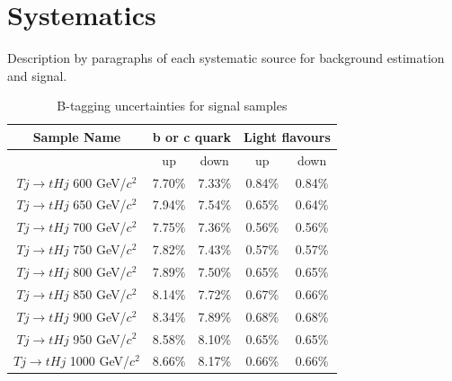 \section{Systematics}
\label{sec:sys}

Description by paragraphs of each systematic source for background estimation and signal.

\begin{table}[htbH]
\begin{center}
\begin{tabular}{|c|c|c|c|c|}
\hline 
Sample Name & \multicolumn{2}{c|}{b or c quark} & \multicolumn{2}{c|}{Light flavours} \\
\hline
 & up & down & up & down \\
\hline
$Tj\rightarrow tHj$ 600 GeV/$c^{2}$ & 7.70\% & 7.33\% & 0.84\% & 0.84\% \\
$Tj\rightarrow tHj$ 650 GeV/$c^{2}$ & 7.94\% & 7.54\% & 0.65\% & 0.64\% \\
$Tj\rightarrow tHj$ 700 GeV/$c^{2}$ & 7.75\% & 7.36\% & 0.56\% & 0.56\% \\
$Tj\rightarrow tHj$ 750 GeV/$c^{2}$ & 7.82\% & 7.43\% & 0.57\% & 0.57\% \\
$Tj\rightarrow tHj$ 800 GeV/$c^{2}$ & 7.89\% & 7.50\% & 0.65\% & 0.65\% \\
$Tj\rightarrow tHj$ 850 GeV/$c^{2}$ & 8.14\% & 7.72\% & 0.67\% & 0.66\% \\
$Tj\rightarrow tHj$ 900 GeV/$c^{2}$ & 8.34\% & 7.89\% & 0.68\% & 0.68\% \\
$Tj\rightarrow tHj$ 950 GeV/$c^{2}$ & 8.58\% & 8.10\% & 0.65\% & 0.65\% \\
$Tj\rightarrow tHj$ 1000 GeV/$c^{2}$ & 8.66\% & 8.17\% & 0.66\% & 0.66\% \\
\hline
\end{tabular}
\caption{B-tagging uncertainties for signal samples\label{tab:SFSys}}
\end{center}
\end{table}\clearpage

